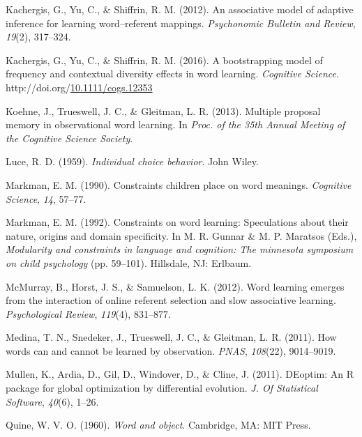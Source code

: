 \documentclass[10pt, letterpaper]{article}
\newenvironment{CSLReferences}%
  {}%
  {\par}
\begin{document}
\begin{CSLReferences}{1}{0}
\leavevmode{}%
Kachergis, G., Yu, C., \& Shiffrin, R. M. (2012). An associative model
of adaptive inference for learning word--referent mappings.
\emph{Psychonomic Bulletin and Review}, \emph{19}(2), 317--324.

\leavevmode{}%
Kachergis, G., Yu, C., \& Shiffrin, R. M. (2016). A bootstrapping model
of frequency and contextual diversity effects in word learning.
\emph{Cognitive Science}.
http://doi.org/\href{https://doi.org/10.1111/cogs.12353}{10.1111/cogs.12353}

\leavevmode{}%
Koehne, J., Trueswell, J. C., \& Gleitman, L. R. (2013). Multiple
proposal memory in observational word learning. In \emph{{Proc. of the
35th Annual Meeting of the Cognitive Science Society}}.

\leavevmode{}%
Luce, R. D. (1959). \emph{Individual choice behavior}. John Wiley.

\leavevmode{}%
Markman, E. M. (1990). Constraints children place on word meanings.
\emph{Cognitive Science}, \emph{14}, 57--77.

\leavevmode{}%
Markman, E. M. (1992). Constraints on word learning: Speculations about
their nature, origins and domain specificity. In M. R. Gunnar \& M. P.
Maratsos (Eds.), \emph{Modularity and constraints in language and
cognition: The minnesota symposium on child psychology} (pp. 59--101).
Hillsdale, NJ: Erlbaum.

\leavevmode{}%
McMurray, B., Horst, J. S., \& Samuelson, L. K. (2012). Word learning
emerges from the interaction of online referent selection and slow
associative learning. \emph{Psychological Review}, \emph{119}(4),
831--877.

\leavevmode{}%
Medina, T. N., Snedeker, J., Trueswell, J. C., \& Gleitman, L. R.
(2011). How words can and cannot be learned by observation. \emph{PNAS},
\emph{108}(22), 9014--9019.

\leavevmode{}%
Mullen, K., Ardia, D., Gil, D., Windover, D., \& Cline, J. (2011).
{DEoptim}: An {R} package for global optimization by differential
evolution. \emph{{J. Of Statistical Software}}, \emph{40}(6), 1--26.

\leavevmode{}%
Quine, W. V. O. (1960). \emph{Word and object}. Cambridge, MA: MIT
Press.


\end{CSLReferences}
\end{document}
